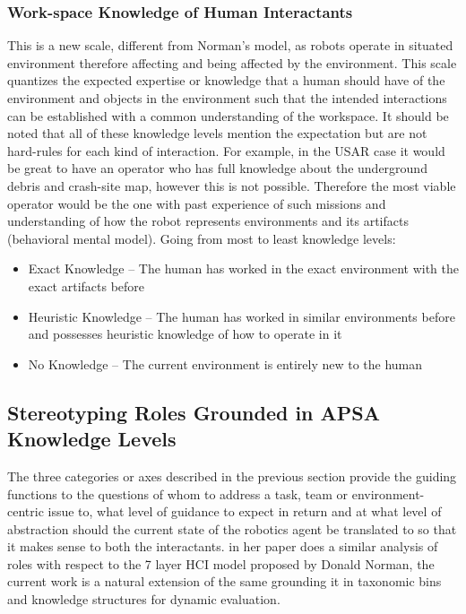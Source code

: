 \documentclass[letterpaper, 10 pt, conference]{ieeeconf} %
\begin{document}
\subsubsection{Work-space Knowledge of Human Interactants}
This is a new scale, different from Norman's model, as robots operate in situated environment
therefore affecting and being affected by the environment. This scale quantizes the expected
expertise or knowledge that a human should have of the environment and objects in the environment
such that the intended interactions can be established with a common understanding of the workspace.
It should be noted that all of these knowledge levels mention the expectation but are not hard-rules
for each kind of interaction. For example, in the USAR case it would be great to have an operator
who has full knowledge about the underground debris and crash-site map, however this is not
possible. Therefore the most viable operator would be the one with past experience of such missions
and understanding of how the robot represents environments and its artifacts (behavioral mental
model). Going from most to least knowledge levels:
\begin{itemize}{}
  \item Exact Knowledge -- The human has worked in the exact environment with the exact artifacts
    before
  \item Heuristic Knowledge -- The human has worked in similar environments before and possesses
    heuristic knowledge of how to operate in it
  \item No Knowledge -- The current environment is entirely new to the human

\end{itemize}

\subsection{Stereotyping Roles Grounded in APSA Knowledge Levels}

The three categories or axes described in the previous section provide the guiding functions to the
questions of whom to address a task, team or environment-centric issue to, what level of guidance to
expect in return and at what level of abstraction should the current state of the robotics agent be
translated to so that it makes sense to both the interactants. \citeauthor[]{Scholtz2003} in her
\citeyear[]{Scholtz2003} paper does a similar analysis of roles with respect to the 7 layer HCI
model proposed by Donald Norman, the current work is a natural extension of the same grounding it in
taxonomic bins and knowledge structures for dynamic evaluation.
\end{document}
